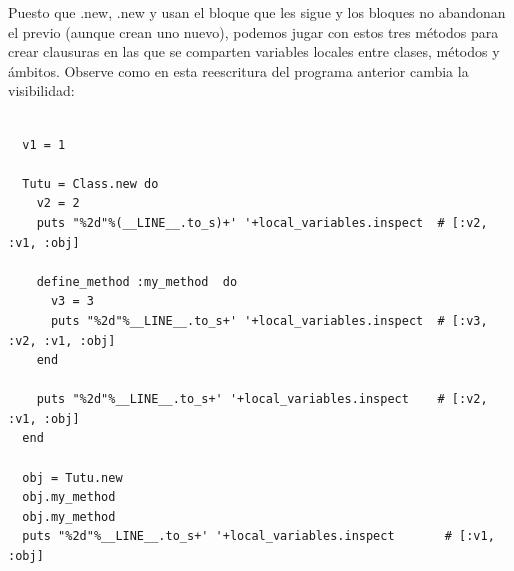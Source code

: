 Puesto que \Class{}.new, \Module{}.new y 
usan el bloque que les sigue y los bloques no abandonan el  previo (aunque 
crean uno nuevo),
podemos jugar con estos tres métodos para crear clausuras en las que se comparten
variables locales entre clases, métodos y ámbitos. Observe como en esta
reescritura del programa anterior cambia la visibilidad:


  \begin{latexonly}
    \begin{lstlisting}

  v1 = 1                  
  
  Tutu = Class.new do
    v2 = 2                
    puts "%2d"%(__LINE__.to_s)+' '+local_variables.inspect  # [:v2, :v1, :obj]
  
    define_method :my_method  do
      v3 = 3
      puts "%2d"%__LINE__.to_s+' '+local_variables.inspect  # [:v3, :v2, :v1, :obj]
    end
  
    puts "%2d"%__LINE__.to_s+' '+local_variables.inspect    # [:v2, :v1, :obj]
  end
  
  obj = Tutu.new
  obj.my_method        
  obj.my_method        
  puts "%2d"%__LINE__.to_s+' '+local_variables.inspect       # [:v1, :obj]

    \end{lstlisting}
  \end{latexonly}
